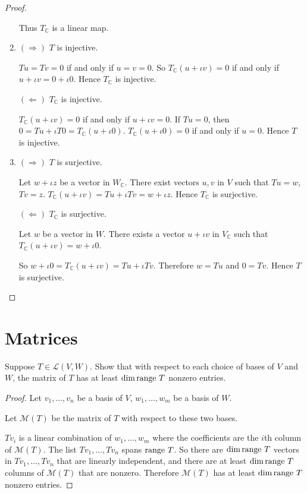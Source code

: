 \begin{proof}
\begin{enumerate}[label={(\alph*)}]
              Thus $T_{\mathbb{C}}$ is a linear map.
        \item $(\Rightarrow)$ $T$ is injective.

              $Tu = Tv = 0$ if and only if $u = v = 0$. So $T_{\mathbb{C}}(u + \iota v) = 0$ if and only if $u + \iota v = 0 + \iota 0$. Hence $T_{\mathbb{C}}$ is injective.

              $(\Leftarrow)$ $T_{\mathbb{C}}$ is injective.

              $T_{\mathbb{C}}(u + \iota v) = 0$ if and only if $u + \iota v = 0$. If $Tu = 0$, then $0 = Tu + \iota T0 = T_{\mathbb{C}}(u + \iota 0)$. $T_{\mathbb{C}}(u + \iota 0) = 0$ if and only if $u = 0$. Hence $T$ is injective.
        \item $(\Rightarrow)$ $T$ is surjective.

              Let $w + \iota z$ be a vector in $W_{\mathbb{C}}$. There exist vectors $u, v$ in $V$ such that $Tu = w$, $Tv = z$. $T_{\mathbb{C}}(u + \iota v) = Tu + \iota Tv = w + \iota z$. Hence $T_{\mathbb{C}}$ is surjective.

              $(\Leftarrow)$ $T_{\mathbb{C}}$ is surjective.

              Let $w$ be a vector in $W$. There exists a vector $u + \iota v$ in $V_{\mathbb{C}}$ such that $T_{\mathbb{C}}(u + \iota v) = w + \iota 0$.

              So $w + \iota 0 = T_{\mathbb{C}}(u + \iota v) = Tu + \iota Tv$. Therefore $w = Tu$ and $0 = Tv$. Hence $T$ is surjective.
    \end{enumerate}
\end{proof}
\newpage

\section{Matrices}

\begin{exercise}
    Suppose $T \in \mathcal{L}(V, W)$. Show that with respect to each choice of bases of $V$ and $W$, the matrix of $T$ has at least $\dim \operatorname{range}\,{T}$ nonzero entries.
\end{exercise}

\begin{proof}
    Let $v_{1}, \ldots, v_{n}$ be a basis of $V$, $w_{1}, \ldots, w_{m}$ be a basis of $W$.

    Let $\mathcal{M}(T)$ be the matrix of $T$ with respect to these two bases.

    $Tv_{i}$ is a linear combination of $w_{1}, \ldots, w_{m}$ where the coefficients are the $i$th column of $\mathcal{M}(T)$. The list $Tv_{1}, \ldots, Tv_{n}$ spans $\operatorname{range}\,{T}$. So there are $\dim\operatorname{range}\,{T}$ vectors in $Tv_{1}, \ldots, Tv_{n}$ that are linearly independent, and there are at least $\dim\operatorname{range}\,{T}$ columns of $\mathcal{M}(T)$ that are nonzero. Therefore $\mathcal{M}(T)$ has at least $\dim\operatorname{range}\,{T}$ nonzero entries.
\end{proof}
\newpage

